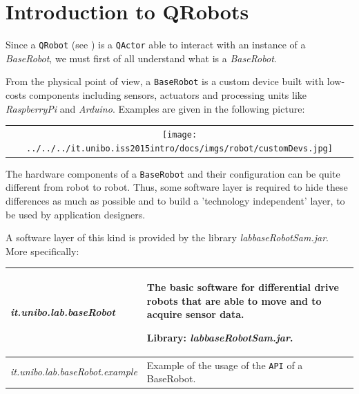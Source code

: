 \newpage
\section{Introduction to QRobots}
 
Since a \texttt{QRobot} (see  ) is a \texttt{QActor} able to interact with an instance of a \textit{BaseRobot}, we must first of all understand what is a \textit{BaseRobot}.


\medskip 
From the physical point of view, a \texttt{BaseRobot} is a custom device built with low-costs components including sensors, actuators and processing units like \textit{RaspberryPi} and \textit{Arduino}. Examples are given in the following picture:

\begin{center}
\begin{tabular}{ c }
     \texttt{[image: ../../../it.unibo.iss2015intro/docs/imgs/robot/customDevs.jpg]}\\
\end{tabular} 
\end{center}


The hardware components of a \texttt{BaseRobot} and their configuration can be quite different from robot to robot. Thus, some software layer is required to hide these differences as much as possible and to build a 'technology independent' layer, to be used by application designers.

A software layer of this kind is provided by the library \textit{labbaseRobotSam.jar}. More specifically:  


\medskip 
\noindent 
\begin{tabular}{|p{}|p{}|}
\hline 
\textit{it.unibo.lab.baseRobot } 
&The basic software for differential drive robots that are able to move and to acquire sensor data. 

\medskip 
Library: \textit{labbaseRobotSam.jar}. 
\\ 
\hline 
\textit{it.unibo.lab.baseRobot.example} 
&Example of the usage of the \texttt{API} of a BaseRobot.
\\ 
\hline 
\end{tabular} 



